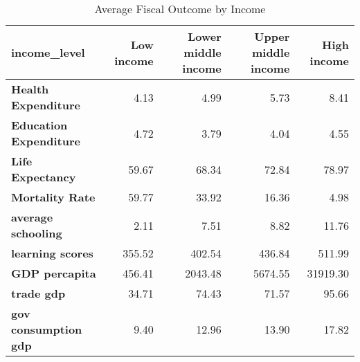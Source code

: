 \begin{table}
\caption{Average Fiscal Outcome by Income}
\label{tab2}
\begin{tabular}{lrrrr}
\toprule
income_level & Low income & Lower middle income & Upper middle income & High income \\
\midrule
\textbf{Health Expenditure} & 4.13 & 4.99 & 5.73 & 8.41 \\
\textbf{Education Expenditure} & 4.72 & 3.79 & 4.04 & 4.55 \\
\textbf{Life Expectancy} & 59.67 & 68.34 & 72.84 & 78.97 \\
\textbf{Mortality Rate} & 59.77 & 33.92 & 16.36 & 4.98 \\
\textbf{average schooling} & 2.11 & 7.51 & 8.82 & 11.76 \\
\textbf{learning scores} & 355.52 & 402.54 & 436.84 & 511.99 \\
\textbf{GDP percapita} & 456.41 & 2043.48 & 5674.55 & 31919.30 \\
\textbf{trade gdp} & 34.71 & 74.43 & 71.57 & 95.66 \\
\textbf{gov consumption gdp} & 9.40 & 12.96 & 13.90 & 17.82 \\
\bottomrule
\end{tabular}
\end{table}
